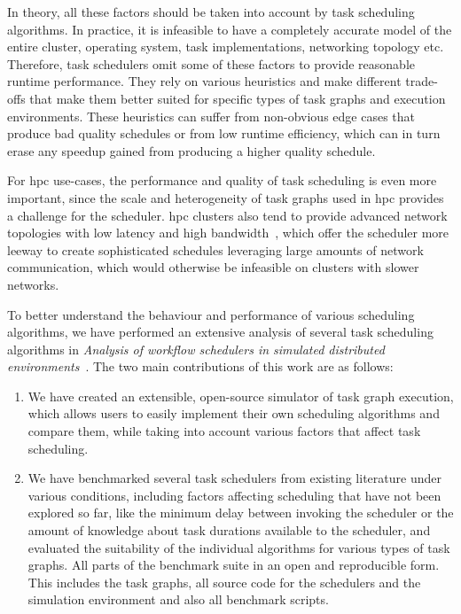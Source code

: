 In theory, all these factors should be taken into account by task scheduling algorithms. In
practice, it is infeasible to have a completely accurate model of the entire cluster, operating
system, task implementations, networking topology etc. Therefore, task schedulers omit some of
these factors to provide reasonable runtime performance. They rely on various heuristics and make
different trade-offs that make them better suited for specific types of task graphs and execution
environments. These heuristics can suffer from non-obvious edge cases that produce bad quality
schedules or from low runtime efficiency, which can in turn erase any speedup gained from producing
a higher quality schedule.

For \gls{hpc} use-cases, the performance and quality of task scheduling is even more
important, since the scale and heterogeneity of task graphs used in \gls{hpc}
provides a challenge for the scheduler. \gls{hpc} clusters also tend to provide
advanced network topologies with low latency and high bandwidth~\cite{dragonfly,slimfly}, which
offer the scheduler more leeway to create sophisticated schedules leveraging large amounts of
network communication, which would otherwise be infeasible on clusters with slower networks.

To better understand the behaviour and performance of various scheduling algorithms, we have
performed an extensive analysis of several task scheduling algorithms in
\emph{Analysis of workflow schedulers in simulated distributed environments}~\cite{estee}. The two main contributions of this work are as
follows:
\begin{enumerate}
	\item We have created an extensible, open-source simulator of task graph execution, which allows users to
	      easily implement their own scheduling algorithms and compare them, while taking into account
	      various factors that affect task scheduling.
	\item We have benchmarked several task schedulers from existing literature under various conditions,
	      including factors affecting scheduling that have not been explored so far, like the minimum delay
	      between invoking the scheduler or the amount of knowledge about task durations available to the
	      scheduler, and evaluated the suitability of the individual algorithms for various types of task
	      graphs. All parts of the benchmark suite in an open and reproducible form. This includes the task
	      graphs, all source code for the schedulers and the simulation environment and also all benchmark
	      scripts.
\end{enumerate}

